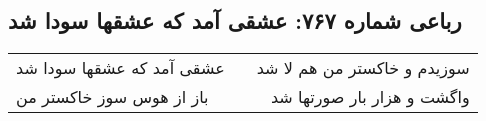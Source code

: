 \begin{center}
\section*{رباعی شماره ۷۶۷: عشقی آمد که عشقها سودا شد}
\label{sec:0767}
\begin{longtable}{l p{0.5cm} r}
عشقی آمد که عشقها سودا شد
&&
سوزیدم و خاکستر من هم لا شد
\\
باز از هوس سوز خاکستر من
&&
واگشت و هزار بار صورتها شد
\\
\end{longtable}
\end{center}
